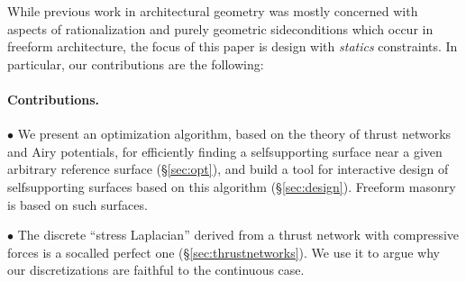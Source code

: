 \documentclass[review]{acmsiggraph}
\newcommand{\secref}[1]{(\S\ref{#1})}
\begin{document}
While previous work in architectural geometry was mostly concerned
with aspects of rationalization and purely geometric side\dash conditions
which occur in freeform architecture, the focus of this paper is design with
{\em statics} constraints. In particular, our
contributions are the following:




\paragraph{Contributions.}


$\bullet$ We present an optimization algorithm, based on the theory of
thrust networks and Airy potentials, for efficiently finding a
self\dash supporting surface near a given arbitrary reference surface
\secref{sec:opt}, and build a tool for interactive design of
self\dash supporting surfaces based on this algorithm \secref{sec:design}.
Freeform masonry is based on such surfaces.

$\bullet$ The discrete ``stress Laplacian''
derived from a thrust network with compressive
forces is a so\dash called perfect one \secref{sec:thrustnetworks}.
We use it to argue why our discretizations are 
faithful to the continuous case.
\end{document}
